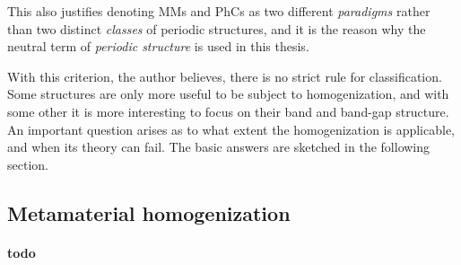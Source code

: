 This also justifies denoting MMs and PhCs as two different \textit{paradigms} rather than two distinct \textit{classes} of periodic structures, and it is the reason why the neutral term of \textit{periodic structure} is used in this thesis. 

With this criterion, the author believes, there is no strict rule for classification. Some structures are only more useful to be subject to homogenization, and with some other it is more interesting to focus on their band and band-gap structure. 
An important question arises as to what extent the homogenization is applicable, and when its theory can fail. The basic answers are sketched in the following section.


%  



\subsection{Metamaterial homogenization} %
\paragraph{todo}%

